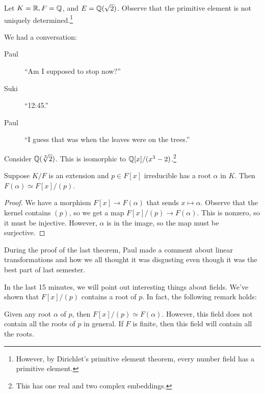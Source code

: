 \documentclass[10pt, twoside]{article}
\begin{document}
    \begin{exm}
        Let $K = \mathbb{R},F = \mathbb{Q}$, and $E = \mathbb{Q}(\sqrt{2})$. Observe that the primitive element is not uniquely determined.\footnote{However, by Dirichlet's primitive element theorem, every number field has a primitive element.}
    \end{exm}

    We had a conversation:
    \begin{description}
        \item[Paul] ``Am I supposed to stop now?'' 
        \item[Suki]  ``12:45.''
        \item[Paul]  ``I guess that was when the leaves were on the trees.''
    \end{description}

    \begin{exm}
        Consider $\mathbb{Q}(\sqrt[3]{2})$. This is isomorphic to $\mathbb{Q}[x]/(x^3-2)$.\footnote{This has one real and two complex embeddings.}
    \end{exm}

    \begin{thm}
        Suppose $K/F$ is an extension and $p \in F[x]$ irreducible has a root $\alpha$ in $K$. Then $F(\alpha) \simeq F[x]/(p)$.

        \begin{proof}
            We have a morphism $F[x] \rightarrow F(\alpha)$ that sends $x \mapsto \alpha$. Observe that the kernel contains $(p)$, so we get a map $F[x]/(p) \rightarrow F(\alpha)$. This is nonzero, so it must be injective. However, $\alpha$ is in the image, so the map must be surjective.
        \end{proof}
    \end{thm}

    During the proof of the last theorem, Paul made a comment about linear transformations and how we all thought it was disgusting even though it was the best part of last semester.

    In the last 15 minutes, we will point out interesting things about fields.
    We've shown that $F[x]/(p)$ contains a root of $p$. In fact, the following remark holds:

    \begin{rmk}
        Given any root $\alpha$ of $p$, then $F[x]/(p) \simeq F(\alpha)$. However, this field does not contain all the roots of $p$ in general. If $F$ is finite, then this field will contain all the roots.
    \end{rmk}
\end{document}
